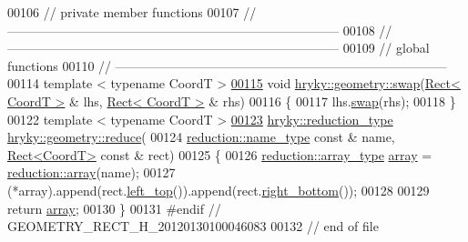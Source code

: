 \begin{DoxyCode}
00106 \textcolor{comment}{// private member functions}
00107 \textcolor{comment}{//
      ------------------------------------------------------------------------------}
00108 \textcolor{comment}{//
      ------------------------------------------------------------------------------}
00109 \textcolor{comment}{// global functions}
00110 \textcolor{comment}{//
      ------------------------------------------------------------------------------}
00114 \textcolor{comment}{}\textcolor{keyword}{template} < \textcolor{keyword}{typename} CoordT >
\hypertarget{geometry__rect_8h_source_l00115}{}\hyperlink{namespacehryky_1_1geometry_a73028b267b1f3811ebacb86acbee6742}{00115} \textcolor{keywordtype}{void} \hyperlink{namespacehryky_1_1geometry_a73028b267b1f3811ebacb86acbee6742}{hryky::geometry::swap}(\hyperlink{classhryky_1_1geometry_1_1_rect}{Rect< CoordT >} & lhs, \hyperlink{classhryky_1_1geometry_1_1_rect}{Rect< CoordT >} & rhs)
00116 \{
00117     lhs.\hyperlink{classhryky_1_1geometry_1_1_rect_a0d7220afb7ed9c0cd1f5d2575205e027}{swap}(rhs);
00118 \}
00122 \textcolor{keyword}{template} < \textcolor{keyword}{typename} CoordT >
\hypertarget{geometry__rect_8h_source_l00123}{}\hyperlink{namespacehryky_1_1geometry_a18354ece30244aa68fc3744f2cdb41fc}{00123} \hyperlink{classhryky_1_1_intrusive_ptr}{hryky::reduction_type} \hyperlink{namespacehryky_1_1geometry_a18354ece30244aa68fc3744f2cdb41fc}{hryky::geometry::reduce}(
00124     \hyperlink{classhryky_1_1reduction_1_1_string}{reduction::name_type} \textcolor{keyword}{const} & name, \hyperlink{classhryky_1_1geometry_1_1_rect}{Rect<CoordT>} \textcolor{keyword}{const} & rect)
00125 \{
00126     \hyperlink{classhryky_1_1_intrusive_ptr}{reduction::array_type} \hyperlink{namespacehryky_1_1reduction_a9d45a4dc1ea9a6668ebd192f296f788c}{array} = \hyperlink{namespacehryky_1_1reduction_a9d45a4dc1ea9a6668ebd192f296f788c}{reduction::array}(name);
00127     (*array).append(rect.\hyperlink{classhryky_1_1geometry_1_1_rect_aad79f890789ec023b8493f263066d8e4}{left_top}()).append(rect.\hyperlink{classhryky_1_1geometry_1_1_rect_a28bb3b1a495b06aad499d7a5384b1a9c}{right_bottom}());
00128     
00129     \textcolor{keywordflow}{return} \hyperlink{namespacehryky_1_1reduction_a9d45a4dc1ea9a6668ebd192f296f788c}{array};
00130 \}
00131 \textcolor{preprocessor}{#endif // GEOMETRY\_RECT\_H\_20120130100046083}
00132 \textcolor{preprocessor}{}\textcolor{comment}{// end of file}
\end{DoxyCode}
